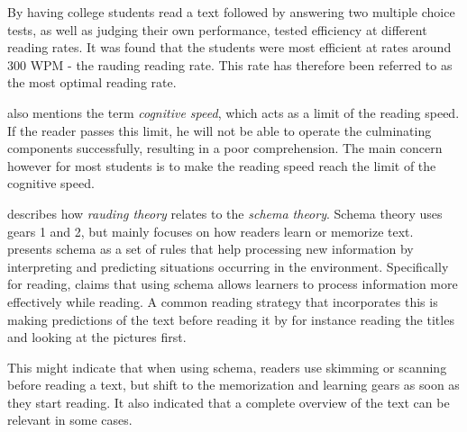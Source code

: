 By having college students read a text followed by answering two multiple choice tests, as well as judging their own performance, \citeauthor{carver_reading_1992} tested efficiency at different reading rates. It was found that the students were most efficient at rates around 300 WPM - the rauding reading rate. This rate has therefore been referred to as the most optimal reading rate.

\citeauthor{carver_reading_1992} also mentions the term \textit{cognitive speed}, which acts as a limit of the reading speed. If the reader passes this limit, he will not be able to operate the culminating components successfully, resulting in a poor comprehension. The main concern however for most students is to make the reading speed reach the limit of the cognitive speed.

\citeauthor{carver_reading_1992} describes how \textit{rauding theory} relates to the \textit{schema theory}. Schema theory uses gears 1 and 2, but mainly focuses on how readers learn or memorize text.  presents schema as a set of rules that help processing new information by interpreting and predicting situations occurring in the environment. Specifically for reading, \citeauthor{widmayer_schema_2005} claims that using schema allows learners to process information more effectively while reading. A common reading strategy that incorporates this is making predictions of the text before reading it by for instance reading the titles and looking at the pictures first.

This might indicate that when using schema, readers use skimming or scanning before reading a text, but shift to the memorization and learning gears as soon as they start reading. It also indicated that a complete overview of the text can be relevant in some cases.

